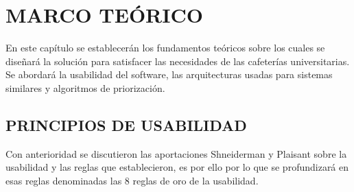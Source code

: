 
\chapter{MARCO TEÓRICO}
\setcounter{figure}{0}
En este capítulo se establecerán los fundamentos teóricos sobre los cuales se diseñará la solución para satisfacer las necesidades de las cafeterías universitarias. Se abordará la usabilidad del software, las arquitecturas usadas para sistemas similares y algoritmos de priorización. 

\section{PRINCIPIOS DE USABILIDAD}
Con anterioridad se discutieron las aportaciones Shneiderman y Plaisant \cite{shneiderman2005designing} sobre la usabilidad y las reglas que establecieron, es por ello por lo que se profundizará en esas reglas denominadas las 8 reglas de oro de la usabilidad.
